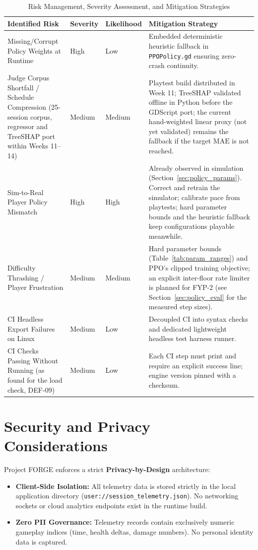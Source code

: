\begin{table}[!htbp]
\centering
\caption{Risk Management, Severity Assessment, and Mitigation Strategies}
\label{tab:risk_matrix}
\small
\begin{tabular}{p{}p{}p{}p{}}
\toprule
\textbf{Identified Risk} & \textbf{Severity} & \textbf{Likelihood} & \textbf{Mitigation Strategy} \\
\midrule
Missing/Corrupt Policy Weights at Runtime & High & Low & Embedded deterministic heuristic fallback in \texttt{PPOPolicy.gd} ensuring zero-crash continuity. \\
\midrule
Judge Corpus Shortfall / Schedule Compression (25-session corpus, regressor and TreeSHAP port within Weeks 11--14) & Medium & Medium & Playtest build distributed in Week 11; TreeSHAP validated offline in Python before the GDScript port; the current hand-weighted linear proxy (not yet validated) remains the fallback if the target $\text{MAE}$ is not reached. \\
\midrule
Sim-to-Real Player Policy Mismatch & High & High & Already observed in simulation (Section~\ref{sec:policy_params}). Correct and retrain the simulator; calibrate pace from playtests; hard parameter bounds and the heuristic fallback keep configurations playable meanwhile. \\
\midrule
Difficulty Thrashing / Player Frustration & Medium & Medium & Hard parameter bounds (Table~\ref{tab:param_ranges}) and PPO's clipped training objective; an explicit inter-floor rate limiter is planned for FYP-2 (see Section~\ref{sec:policy_eval} for the measured step sizes). \\
\midrule
CI Headless Export Failures on Linux & Medium & Low & Decoupled CI into syntax checks and dedicated lightweight headless test harness runner. \\
\midrule
CI Checks Passing Without Running (as found for the load check, DEF-09) & Medium & Low & Each CI step must print and require an explicit success line; engine version pinned with a checksum. \\
\bottomrule
\end{tabular}
\end{table}

\section{Security and Privacy Considerations}
\label{sec:ethics}
Project FORGE enforces a strict \textbf{Privacy-by-Design} architecture:
\begin{itemize}
    \item \textbf{Client-Side Isolation:} All telemetry data is stored strictly in the local application directory (\texttt{user://session\_telemetry.json}). No networking sockets or cloud analytics endpoints exist in the runtime build.
    \item \textbf{Zero PII Governance:} Telemetry records contain exclusively numeric gameplay indices (time, health deltas, damage numbers). No personal identity data is captured.
\end{itemize}

